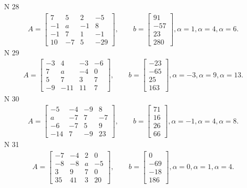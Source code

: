 \documentclass[11pt]{report}
\begin{document}
N 28
\begin{align*}
 A = \left[\begin{matrix}7 & 5 & 2 & -5\\-1 & a & -1 & 8\\-1 & 7 & 1 & -1\\10 & -7 & 5 & -29\end{matrix}\right],
    \qquad b = \left[\begin{matrix}91\\-57\\23\\280\end{matrix}\right], \alpha = 1, \alpha = 4, \alpha = 6. 
 \end{align*}
N 29
\begin{align*}
 A = \left[\begin{matrix}-3 & 4 & -3 & -6\\7 & a & -4 & 0\\5 & 7 & 3 & 7\\-9 & -11 & 11 & 7\end{matrix}\right],
    \qquad b = \left[\begin{matrix}-23\\-65\\25\\163\end{matrix}\right], \alpha = -3, \alpha = 9, \alpha = 13. 
 \end{align*}
N 30
\begin{align*}
 A = \left[\begin{matrix}-5 & -4 & -9 & 8\\a & -7 & 7 & -7\\-6 & -7 & 5 & 9\\-14 & 7 & -9 & 23\end{matrix}\right],
    \qquad b = \left[\begin{matrix}71\\16\\26\\66\end{matrix}\right], \alpha = -1, \alpha = 4, \alpha = 8. 
 \end{align*}
N 31
\begin{align*}
 A = \left[\begin{matrix}-7 & -4 & 2 & 0\\-8 & -8 & a & -5\\3 & 9 & 7 & 0\\35 & 41 & 3 & 20\end{matrix}\right],
    \qquad b = \left[\begin{matrix}0\\-69\\-18\\186\end{matrix}\right], \alpha = 0, \alpha = 1, \alpha = 4. 
 \end{align*}
\end{document}
